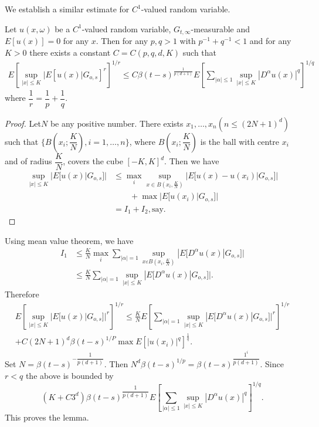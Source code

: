 We establish a similar estimate for $C^1$-valued random variable.

\begin{Lemma}\label{c3:lem3.10.2} %
  Let $u(x,\omega)$ be a $C^1$-valued random variable, $G_{t,
    \infty}$-\break measurable and $E[u(x)]=0$ for any $x$. Then for any
  $p,q>1$ with $p^{-1}+q^{-1}<1$ and for any $K>0$ there exists a
  constant $C=C(p,q,d,K)$ such that 
  \begin{multline*}
    E \left[\sup _{|x|\le K}|E\left[u(x)|G_{o,s}\right]^r\right]^{1/r} \le C\beta
    (t-s)^{\frac{1}{p(d+1)}} 
    E \left[ \sum_{|\alpha|\le 1} \sup _{|x|\le
        K}|D^\alpha u(x)|^q\right]^{1/q} \tag{3.10.4} \label{c3:eq3.10.4}
  \end{multline*}
  where $\dfrac{1}{r}=\dfrac{1}{p}+\dfrac{1}{q}$.
\end{Lemma}

\begin{proof}
  Let\pageoriginale $N$ be any positive number. There exists $x_1,  \ldots,  x_n (n
  \le (2N+1)^d)$ such that $\{ B(x_i; \dfrac{K}{N}),i=1, \ldots, n
  \}$, where $B(x_i; \dfrac{K}{N})$ is the ball with centre $x_i$ and
  of radius $\dfrac{K}{N}$, covers the cube $[-K,K]^d$. Then we have  
  \begin{align*}
  \sup_{|x|\leq K}|E[u(x)|G_{o,s}]| & \leq \max_i \sup_{x \in
    B(x_i,\frac{K}{N})} |E[u(x)-u(x_i)|G_{o,s}]| \\
  &\qquad  + \max |E[u(x_i)|G_{o,s}]| \\
  & = I_1+I_2, \text{say}. \tag{3.10.5}\label{c3:eq3.10.5}
  \end{align*}
\end{proof}

Using mean value theorem, we have
\begin{align*}
  I_1 & \leq \frac{K}{N} \max_i \sum_{|\alpha|=1}\sup_{x \varepsilon
    B(x_i,\frac{K}{N})}|E[D^\alpha u (x)|G_{o,s}]| \\
  & \leq \frac{K}{N} \sum_{|\alpha |=1}\sup_{|x|\leq K}|E[D^\alpha u (x)|G_{o,s}]|.
\end{align*}
Therefore
\begin{multline*}
  E\left[\sup_{|x|\leq K}|E[u (x)|G_{o,s}]|^r\right]^{1/r} \leq
  \frac{K}{N}E\left[\sum_{|\alpha|=1} \sup_{|x|\leq K}|E[D^\alpha u
   (x)|G_{o,s}]|^r\right]^{1/r}\\
  +C(2N+1)^d \beta(t-s)^{1/P}\max E[|u(x_i)|^q]^{\frac{1}{q}}. 
\end{multline*}
Set $N=\beta(t-s)^{-\dfrac{1}{p(d+1)}}$. Then $N^d
\beta(t-s)^{1/p} = \beta(t-s)^{\dfrac{1^i}{p(d+1)}}$. Since $r< q$ the
above is bounded by  
$$
(K+C3^d) \beta (t-s)^{\dfrac{1}{p(d+1)}} E\left[ \sum_{|\alpha| \leq
    1} \sup\limits_{|x| \leq K} |D^\alpha u(x)|^q\right]^{1/q}. 
$$
This proves the lemma.


